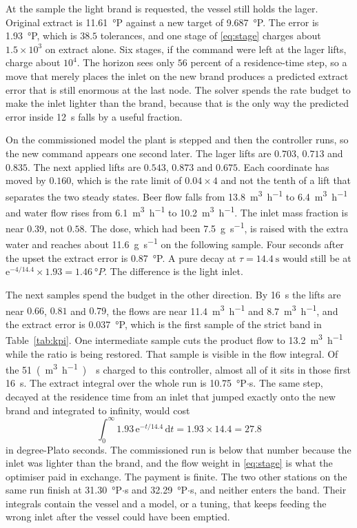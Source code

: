 At the sample the light brand is requested, the vessel still holds the lager. Original extract is \SI{11.61}{\degree}P against a new target of \SI{9.687}{\degree}P. The error is \SI{1.93}{\degree}P, which is $38.5$ tolerances, and one stage of \eqref{eq:stage} charges about $1.5\times 10^{3}$ on extract alone. Six stages, if the command were left at the lager lifts, charge about $10^{4}$. The horizon sees only $56$ percent of a residence-time step, so a move that merely places the inlet on the new brand produces a predicted extract error that is still enormous at the last node. The solver spends the rate budget to make the inlet lighter than the brand, because that is the only way the predicted error inside \SI{12}{\second} falls by a useful fraction.

On the commissioned model the plant is stepped and then the controller runs, so the new command appears one second later. The lager lifts are $0.703$, $0.713$ and $0.835$. The next applied lifts are $0.543$, $0.873$ and $0.675$. Each coordinate has moved by $0.160$, which is the rate limit of $0.04\times 4$ and not the tenth of a lift that separates the two steady states. Beer flow falls from \SI{13.8}{\cubic\metre\per\hour} to \SI{6.4}{\cubic\metre\per\hour} and water flow rises from \SI{6.1}{\cubic\metre\per\hour} to \SI{10.2}{\cubic\metre\per\hour}. The inlet mass fraction is near $0.39$, not $0.58$. The dose, which had been \SI{7.5}{\gram\per\second}, is raised with the extra water and reaches about \SI{11.6}{\gram\per\second} on the following sample. Four seconds after the upset the extract error is \SI{0.87}{\degree}P. A pure decay at $\tau=\SI{14.4}{\second}$ would still be at $\mathrm{e}^{-4/14.4}\times 1.93=\SI{1.46}{\degree}P$. The difference is the light inlet.

The next samples spend the budget in the other direction. By \SI{16}{\second} the lifts are near $0.66$, $0.81$ and $0.79$, the flows are near \SI{11.4}{\cubic\metre\per\hour} and \SI{8.7}{\cubic\metre\per\hour}, and the extract error is \SI{0.037}{\degree}P, which is the first sample of the strict band in Table~\ref{tab:kpi}. One intermediate sample cuts the product flow to \SI{13.2}{\cubic\metre\per\hour} while the ratio is being restored. That sample is visible in the flow integral. Of the \SI{51}{(\cubic\metre\per\hour)\cdot s} charged to this controller, almost all of it sits in those first \SI{16}{\second}. The extract integral over the whole run is \SI{10.75}{\degree}P$\cdot$s. The same step, decayed at the residence time from an inlet that jumped exactly onto the new brand and integrated to infinity, would cost
\begin{equation}
\int_{0}^{\infty} 1.93\,\mathrm{e}^{-t/14.4}\,\mathrm{d}t
=
1.93\times 14.4
=
27.8
\end{equation}
in degree-Plato seconds. The commissioned run is below that number because the inlet was lighter than the brand, and the flow weight in \eqref{eq:stage} is what the optimiser paid in exchange. The payment is finite. The two other stations on the same run finish at \SI{31.30}{\degree}P$\cdot$s and \SI{32.29}{\degree}P$\cdot$s, and neither enters the band. Their integrals contain the vessel and a model, or a tuning, that keeps feeding the wrong inlet after the vessel could have been emptied.

